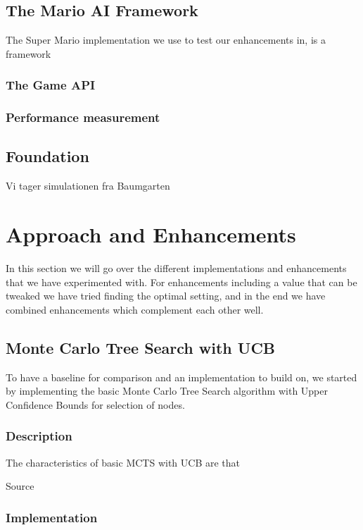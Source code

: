 \documentclass[10pt,a4paper]{article}
\begin{document}
\subsection{The Mario AI Framework}
The Super Mario implementation we use to test our enhancements in, is a framework 
\subsubsection{The Game API}

\subsubsection{Performance measurement}

\subsection{Foundation}
Vi tager simulationen fra Baumgarten

\clearpage

\section{Approach and Enhancements}
In this section we will go over the different implementations and enhancements that we have experimented with. For enhancements including a value that can be tweaked we have tried finding the optimal setting, and in the end we have combined enhancements which complement each other well.

\subsection{Monte Carlo Tree Search with UCB}
To have a baseline for comparison and an implementation to build on, we started by implementing the basic Monte Carlo Tree Search algorithm with Upper Confidence Bounds for selection of nodes.

\subsubsection{Description}
The characteristics of basic MCTS with UCB are that 

Source \cite{mctssurvey}

\subsubsection{Implementation}
\end{document}
